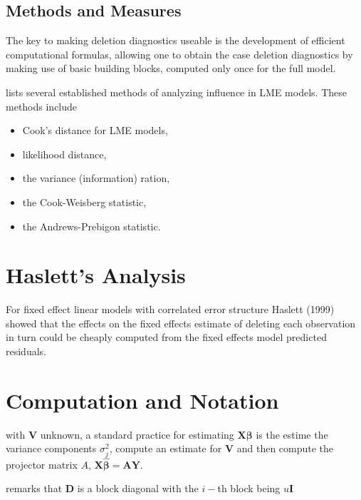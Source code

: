 \documentclass[12pt, a4paper]{report}
\theoremstyle{plain}
\theoremstyle{definition}
\theoremstyle{remark}
\begin{document}
	\subsection{Methods and Measures}
	The key to making deletion diagnostics useable is the development of efficient computational formulas, allowing one to obtain the  case deletion diagnostics by making use of basic building blocks, computed only once for the full model.
	
	\citet{Zewotir} lists several established methods of analyzing influence in LME models. These methods include \begin{itemize}
		\item Cook's distance for LME models,
		\item {} likelihood distance,
		\item the variance (information) ration,
		\item the  Cook-Weisberg statistic,
		\item the  Andrews-Prebigon statistic.
	\end{itemize}
	
	
	\section{Haslett's Analysis} %
	For fixed effect linear models with correlated error structure Haslett (1999) showed that the effects on
	the fixed effects estimate of deleting each observation in turn could be cheaply computed from the fixed effects model predicted residuals.
	
	
	
	
	\section{Computation and Notation } %
	with $\boldsymbol{V}$ unknown, a standard practice for estimating $\boldsymbol{X \beta}$ is the estime the variance components $\sigma^2_j$,
	compute an estimate for $\boldsymbol{V}$ and then compute the projector matrix $A$, $\boldsymbol{X \hat{\beta}}  = \boldsymbol{AY}$.
	
	
	\citet{Zewotir} remarks that $\boldsymbol{D}$ is a block diagonal with the $i-$th block being $u \boldsymbol{I}$
	
\end{document}
